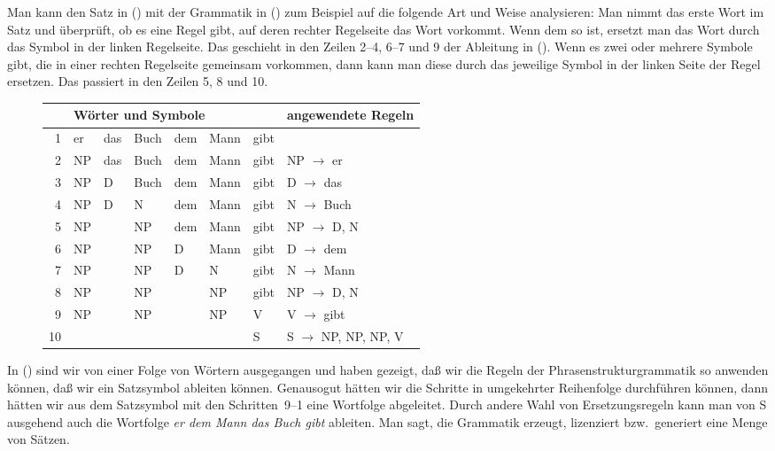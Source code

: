 Man kann den Satz in () mit der Grammatik in () zum Beispiel auf die folgende Art und Weise analysieren:
Man nimmt das erste Wort im Satz und überprüft, ob es eine Regel gibt, auf deren rechter Regelseite
das Wort vorkommt. Wenn dem so ist, ersetzt man das Wort durch das Symbol in der linken Regelseite.
Das geschieht in den Zeilen 2--4, 6--7 und 9 der Ableitung in ().
Wenn es zwei oder mehrere Symbole gibt, die in einer rechten Regelseite gemeinsam vorkommen, dann
kann man diese durch das jeweilige Symbol in der linken Seite der Regel ersetzen. Das passiert in
den Zeilen 5, 8 und 10. 
\begin{figure}[htbp]
\ea
\label{bsp-anwendung-grammatik}
\begin{tabular}[t]{@{}r|llllll@{\hspace{1.8cm}}l}
 & \multicolumn{6}{l}{Wörter und Symbole} & angewendete Regeln\\\hline
 1 & er            & das          & Buch          & dem          & Mann & gibt                \\
 2 & {NP}          & das          & Buch          & dem          & Mann & gibt & {NP $\to$ er}  \\
 3 & NP            & {D}          & Buch          & dem          & Mann & gibt & {D $\to$ das}  \\
 4 & NP            & D            & {N}           & dem          & Mann & gibt & {N $\to$ Buch} \\
 5 & NP            &              & {NP}          & dem          & Mann & gibt & {NP $\to$ D, N}\\
 6 & NP            &              & NP            & {D}          & Mann & gibt & {D $\to$ dem}  \\
 7 & NP            &              & NP            & D            & {N}  & gibt & {N $\to$ Mann} \\
 8 & NP            &              & NP            &              & {NP} & gibt & {NP $\to$ D, N}\\
 9 & NP            &              & NP            &              & NP   & {V} & {V $\to$ gibt}  \\
10 &               &              &               &              &      & {S} & {S $\to$ NP, NP, NP, V}\\
\end{tabular}
\z
\vspace{-\baselineskip}\end{figure}
In () sind wir von einer Folge von Wörtern ausgegangen und haben gezeigt, daß wir die Regeln
der Phrasenstrukturgrammatik so anwenden können, daß wir ein Satzsymbol ableiten können. Genausogut
hätten wir die Schritte in umgekehrter Reihenfolge durchführen können, dann hätten wir aus dem
Satzsymbol mit den Schritten~9--1 eine Wortfolge abgeleitet. Durch andere Wahl von Ersetzungsregeln
kann man von S ausgehend \ua auch die Wortfolge \emph{er dem Mann das Buch gibt} ableiten. Man sagt,
die Grammatik erzeugt, lizenziert bzw.\ generiert eine Menge von Sätzen.

